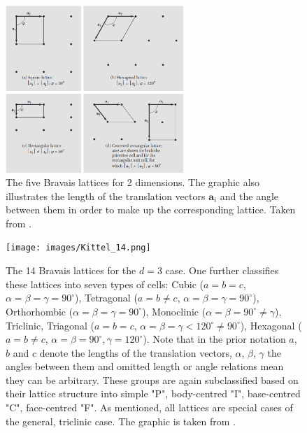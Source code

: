 \documentclass[11pt,a4paper]{article}
\begin{document}
\begin{figure}[htbp]
    \centering
    \includegraphics[width=0.6\textwidth]{images/Kittel_7.png}
    \caption{The five Bravais lattices for 2 dimensions. The graphic also illustrates the length of the translation vectors $\bm{a}_i$ and the angle between them in order to make up the corresponding lattice. Taken from \cite[Fig. 7]{kittelChapter1Crystal2005}.}
    \label{fig:bravais2D}
\end{figure}

\begin{figure}[htbp]
    \centering
    \texttt{[image: images/Kittel\_14.png]}
    \caption{The 14 Bravais lattices for the $d=3$ case. 
    One further classifies these lattices into seven types of cells: Cubic ($a{=}b{=}c$, $\alpha {=} \beta {=} \gamma{=}90^\circ$), Tetragonal ($a{=}b {\neq} c$, $\alpha {=} \beta {=} \gamma{=}90^\circ$), Orthorhombic ($\alpha {=} \beta {=} \gamma{=} 90^\circ$), Monoclinic ($\alpha {=} \beta{=}90^\circ {\neq} \gamma$), Triclinic, Triagonal ($a{=}b{=}c$, $\alpha {=} \beta {=} \gamma <120^\circ {\neq} 90^\circ$), Hexagonal ($a{=}b{\neq} c$, $\alpha {=} \beta{=} 90^\circ, \gamma{=} 120^\circ$). 
    Note that in the prior notation $a$, $b$ and $c$ denote the lengths of the translation vectors, $\alpha$, $\beta$, $\gamma$ the angles between them and omitted length or angle relations mean they can be arbitrary. 
    These groups are again subclassified based on their lattice structure into simple "P", body-centred "I", base-centred "C", face-centred "F". 
    As mentioned, all lattices are special cases of the general, triclinic case. The graphic is taken from \cite[Fig. 14]{kittelChapter1Crystal1971}.}
    \label{fig:bravais3D}
\end{figure}
\end{document}
